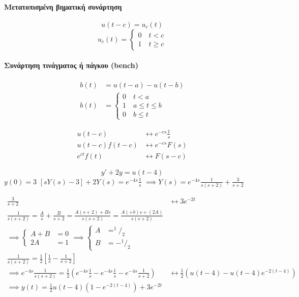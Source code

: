 \documentclass[11pt,a4paper,titlepage,final]{article}
\begin{document}
\paragraph{Μετατοπισμένη βηματική συνάρτηση}
\[
u(t-c)=u_c(t)
\]
\[
u_c(t) = \begin{cases}
0 \quad t < c \\
1 \quad t \geq c
\end{cases}
\]

\paragraph{Συνάρτηση τινάγματος ή πάγκου \textlatin{(bench)}}
\begin{align*}
b(t) &= u(t-a)-u(t-b)\\
b(t) &= \begin{cases}
0 \quad t <a \\
1 \quad a \leq t \leq b \\
0 \quad b \leq t
\end{cases}
\end{align*}

\begin{align*}
u(t-c) & \leftrightarrow e^{-cs}\frac{1}{s}\\
u(t-c)f(t-c) &\leftrightarrow e^{-cs}F(s) \\
e^{ct}f(t) &\leftrightarrow F(s-c)
\end{align*}

\begin{exercise*}{13.1}
	\[
	y'+2y=u(t-4)
	\]
	\( y(0)=3 \)
	\tcblower
	\( [sY(s)-3]+2Y(s) = e^{-4s}\frac{1}{s} \)
	\( \implies Y(s) = e^{-4s}\frac{1}{s(s+2)}+\frac{3}{s+2} \)
	
	\begin{align*}
	\frac{3}{s+2} &\leftrightarrow 3e^{-2t}\\
	\frac{1}{s(s+2)} = \frac{A}{s} + \frac{B}{s+2} = \frac{A(s+2)+Bs}{s(s+2)} = \frac{A(+b)s+(2A)}{s(s+2)} \\
	\implies \begin{cases}
	A+B&=0\\2A&=1
	\end{cases} \implies \begin{cases}
A &= ^1/_2 \\ B&= - ^1/_2
	\end{cases} \\
	\frac{1}{s(s+2)} = \frac{1}{2} \left[\frac{1}{s}-\frac{1}{s+2}\right]
	\\ \implies e^{-4s}\frac{1}{s(s+2)} = \frac{1}{2} \left(
	e^{-4s}\frac{1}{s}-e^{-4s}\frac{1}{s}-e^{-4s}\frac{1}{s+2}
	\right) &\leftrightarrow \frac{1}{2}\left(u(t-4)-u(t-4)e^{-2(t-4)}\right) 
	\\
	\implies \boxed{
		y(t) = \frac{1}{2}u(t-4)\left(1-e^{-2(t-4)}\right)+3e^{-2t}
	}
\end{align*}
\end{exercise*}
\end{document}
